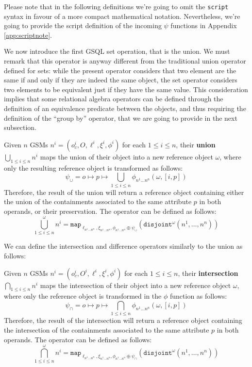 Please note that in the following definitions we're going to omit the \texttt{script} syntax in favour of a more compact mathematical notation. Nevertheless, we're going to provide the script definition of the incoming $\psi$ functions in Appendix \vref{app:scriptnote}.

We now introduce the first GSQL set operation, that is the union. 
We must remark that this operator is anyway different from the traditional union operator defined for sets: while the present operator considers that two element are the same if and only if they are indeed the same object, the set operator considers two elements to be equivalent just if they have the same value. This consideration implies that some relational algebra operators can be defined through the definition of an equivalence predicate between the objects, and thus requiring the definition of the ``group by'' operator, that we are going to provide in the next subsection.


\begin{definition}[Union]\label{def:gsmunion}
	Given $n$ GSMs  $n^i=(o_c^i,O,\ell^i,\xi^i,\phi^i)$ for each $1\leq i\leq n$, their \textbf{union} $\bigcup_{1\leq i\leq n}n^i$ maps the union of their object into a new reference object $\omega$, where only the resulting reference object is transformed as follows:
	\[\psi_\cup=o\mapsto p\mapsto\bigcup_{1\leq i\leq n}\phi_{n^1\dots n^n}(\omega,[i,p])\]
	Therefore, the result of the union will return a reference object containing either the union of the containments associated to the same attribute $p$ in both operands, or their preservation. The operator can be defined as follows:
	\[\bigcup_{1\leq i\leq n}^\omega n^i=\texttt{map}_{\ell_{n^1\dots n^n},\xi_{n^1\dots n^n},\phi_{n^1\dots n^n}\oplus \psi_\cup}(\texttt{disjoint}^\omega(n^1,\dots,n^n))\]
\end{definition}

We can define the intersection and difference operators similarly to the union as follows:
\begin{definition}[Intersection]
	Given $n$ GSMs  $n^i=(o_c^i,O^i,\ell^i,\xi^i,\phi^i)$ for each $1\leq i\leq n$, their \textbf{intersection} $\bigcap_{1\leq i\leq n}n^i$ maps the intersection of their object into a new reference object $\omega$, where only the reference object is transformed in the $\phi$ function as follows:
	\[\psi_\cap=o\mapsto p\mapsto\bigcap_{1\leq i\leq n}\phi_{n^1\dots n^n}(\omega,[i,p])\]
	Therefore, the result of the intersection will return a reference object containing the intersection of the containments associated to the same attribute $p$ in both operands. The operator can be defined as follows:
	\[\bigcap_{1\leq i\leq n}^\omega n^i=\texttt{map}_{\ell_{n^1\dots n^n},\xi_{n^1\dots n^n},\phi_{n^1\dots n^n}\oplus \psi_\cap}(\texttt{disjoint}^\omega(n^1,\dots,n^n))\]
\end{definition}

